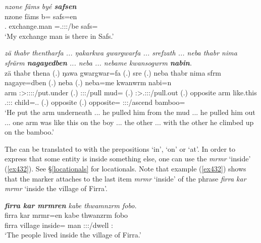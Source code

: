 \begin{exe}
	\ex \emph{nzone fäms byé \textbf{safsen}}\\
	\gll nzone fäms b= safs=en\\
	\Fsg.\Poss{} {exchange.man} \Med=\Tsg.\Masc:\Sbj:\Nonpast:\Ipfv/be safs=\Loc{}\\
	\trans `My exchange man is there in Safs.'
	\label{ex431}
\end{exe}
\begin{exe}
	\ex \emph{zä thabr thentharfa ... ŋakarkwa gwargwarfa ... srefzath ... neba thabr nima sfrärm \textbf{nagayedben} ... neba ... nebame kwansogwrm \textbf{nabin}.}\\
	\gll zä thabr thena (.) ŋawa gwargwar=fa (.) sre (.) neba thabr nima sfrm nagaye=dben (.) neba (.) neba=me kwanwrm nabi=n\\
	\Prox{} arm \Stsg:\Sbj>\Stpl:\Obj:\Pst:\Pfv:\Venit/put.under (.) \Stsg:\Sbj:\Pst:\Ipfv/pull mud=\Abl{} (.) \Stsg:\Sbj>\Tsg.\Masc:\Obj:\Irr:\Pfv/pull.out (.) opposite arm {like.this} \Tsg.\Masc:\Sbj:\Pst:\Dur{} child=\Loc.\Anim.\Sg{} (.) opposite (.) opposite=\Ins{} \Stsg:\Sbj:\Pst:\Dur/ascend bamboo=\Loc{}\\
	\trans `He put the arm underneath ... he pulled him from the mud ... he pulled him out ... one arm was like this on the boy ... the other ... with the other he climbed up on the bamboo.'
	\label{ex430}
\end{exe}

The  can be translated to  with the prepositions `in', `on' or `at'. In order to express that some entity is inside something else, one can use the   \emph{mrmr} `inside' (\ref{ex432}). See \S{}\ref{locationals} for locationals. Note that example (\ref{ex432}) shows that the  marker attaches to the last item \emph{mrmr} `inside' of the phrase \emph{firra kar mrmr} `inside the village of Firra'.
	
\begin{exe}
	\ex \emph{\textbf{firra kar mrmren} kabe thwamnzrm fobo.}\\
	\gll firra kar mrmr=en kabe thwanzrm fobo\\
	firra village inside=\Loc{} man \Stpl:\Sbj:\Pst:\Dur/dwell \Dist:\All{}\\
	\trans `The people lived inside the village of Firra.'
	\label{ex432}
\end{exe}

